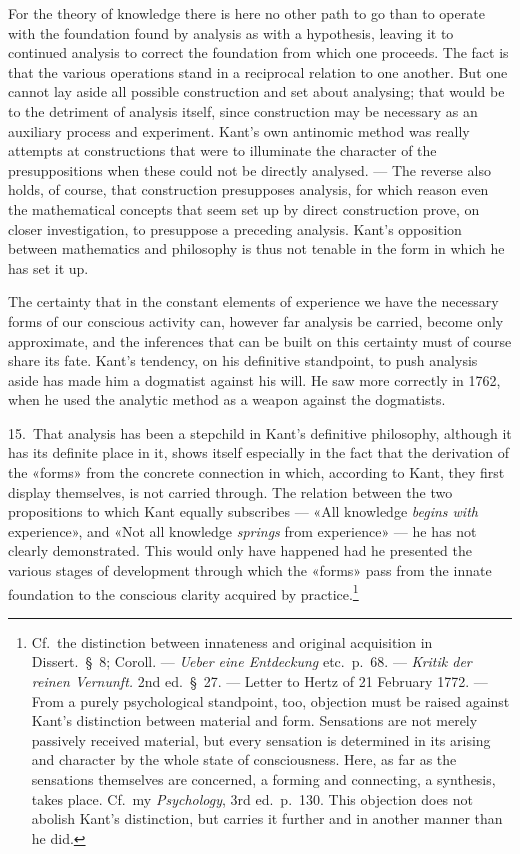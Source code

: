 \documentclass[12pt,a4paper]{article}
\begin{document}
For the theory of knowledge there is here no other path to go than to
operate with the foundation found by analysis as with a hypothesis, leaving
it to continued analysis to correct the foundation from which one proceeds.
The fact is that the various operations stand in a reciprocal relation to
one another. But one cannot lay aside all possible construction and set about
analysing; that would be to the detriment of analysis itself, since
construction may be necessary as an auxiliary process and experiment.
Kant's own antinomic method was really attempts at constructions that were
to illuminate the character of the presuppositions when these could not be
directly analysed. --- The reverse also holds, of course, that construction
presupposes analysis, for which reason even the mathematical concepts that
seem set up by direct construction prove, on closer investigation, to
presuppose a preceding analysis. Kant's opposition between mathematics and
philosophy is thus not tenable in the form in which he has set it up.

The certainty that in the constant elements of experience we have the
necessary forms of our conscious activity can, however far analysis be
carried, become only approximate, and the inferences that can be built on
this certainty must of course share its fate. Kant's
tendency, on his definitive standpoint, to push analysis aside has made him
a dogmatist against his will. He saw more correctly in 1762, when he used
the analytic method as a weapon against the dogmatists.

15.\ That analysis has been a stepchild in Kant's definitive philosophy,
although it has its definite place in it, shows itself especially in the
fact that the derivation of the «forms» from the concrete connection in
which, according to Kant, they first display themselves, is not carried
through. The relation between the two propositions to which Kant equally
subscribes --- «All knowledge \emph{begins with} experience», and «Not all
knowledge \emph{springs} from experience» --- he has not clearly demonstrated.
This would only have happened had he presented the various stages of
development through which the «forms» pass from the innate foundation to the
conscious clarity acquired by practice.\footnote{Cf.\ the distinction
between innateness and original acquisition in Dissert.\ §\ 8; Coroll. ---
\textit{Ueber eine Entdeckung} etc.\ p.\ 68. --- \textit{Kritik der reinen
Vernunft.} 2nd ed.\ §\ 27. --- Letter to Hertz of 21 February 1772. ---
From a purely psychological standpoint, too, objection must be raised
against Kant's distinction between material and form. Sensations are not
merely passively received material, but every sensation is determined in
its arising and character by the whole state of consciousness. Here, as far
as the sensations themselves are concerned, a forming and connecting, a
synthesis, takes place. Cf.\ my \textit{Psychology}, 3rd ed.\ p.\ 130. This
objection does not abolish Kant's distinction, but carries it further and
in another manner than he did.}
\end{document}
